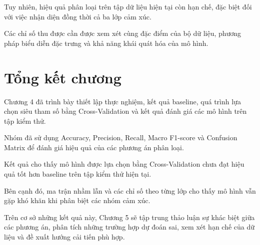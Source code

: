 Tuy nhiên, hiệu quả phân loại trên tập
dữ liệu hiện tại còn hạn chế, đặc biệt
đối với việc nhận diện đồng thời cả ba
lớp cảm xúc.

Các chỉ số thu được cần được xem xét cùng
đặc điểm của bộ dữ liệu, phương pháp
biểu diễn đặc trưng và khả năng khái quát
hóa của mô hình.



\section{Tổng kết chương}

Chương 4 đã trình bày thiết lập thực nghiệm,
kết quả baseline, quá trình lựa chọn siêu
tham số bằng Cross-Validation và kết quả
đánh giá các mô hình trên tập kiểm thử.

Nhóm đã sử dụng Accuracy, Precision, Recall,
Macro F1-score và Confusion Matrix để đánh
giá hiệu quả của các phương án phân loại.

Kết quả cho thấy mô hình được lựa chọn bằng
Cross-Validation chưa đạt hiệu quả tốt hơn
baseline trên tập kiểm thử hiện tại.

Bên cạnh đó, ma trận nhầm lẫn và các chỉ
số theo từng lớp cho thấy mô hình vẫn gặp
khó khăn khi phân biệt các nhóm cảm xúc.

Trên cơ sở những kết quả này, Chương 5
sẽ tập trung thảo luận sự khác biệt giữa
các phương án, phân tích những trường hợp
dự đoán sai, xem xét hạn chế của dữ liệu
và đề xuất hướng cải tiến phù hợp.
